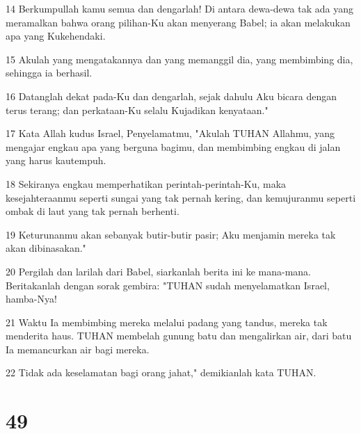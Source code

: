 \par 14 Berkumpullah kamu semua dan dengarlah! Di antara dewa-dewa tak ada yang meramalkan bahwa orang pilihan-Ku akan menyerang Babel; ia akan melakukan apa yang Kukehendaki.
\par 15 Akulah yang mengatakannya dan yang memanggil dia, yang membimbing dia, sehingga ia berhasil.
\par 16 Datanglah dekat pada-Ku dan dengarlah, sejak dahulu Aku bicara dengan terus terang; dan perkataan-Ku selalu Kujadikan kenyataan."
\par 17 Kata Allah kudus Israel, Penyelamatmu, "Akulah TUHAN Allahmu, yang mengajar engkau apa yang berguna bagimu, dan membimbing engkau di jalan yang harus kautempuh.
\par 18 Sekiranya engkau memperhatikan perintah-perintah-Ku, maka kesejahteraanmu seperti sungai yang tak pernah kering, dan kemujuranmu seperti ombak di laut yang tak pernah berhenti.
\par 19 Keturunanmu akan sebanyak butir-butir pasir; Aku menjamin mereka tak akan dibinasakan."
\par 20 Pergilah dan larilah dari Babel, siarkanlah berita ini ke mana-mana. Beritakanlah dengan sorak gembira: "TUHAN sudah menyelamatkan Israel, hamba-Nya!
\par 21 Waktu Ia membimbing mereka melalui padang yang tandus, mereka tak menderita haus. TUHAN membelah gunung batu dan mengalirkan air, dari batu Ia memancurkan air bagi mereka.
\par 22 Tidak ada keselamatan bagi orang jahat," demikianlah kata TUHAN.

\chapter{49}

